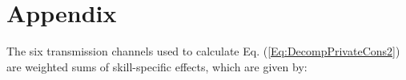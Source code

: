 \documentclass[a4paper,12pt]{article}
\begin{document}

\section{Appendix}
\label{Appendix B}

The six transmission channels used to calculate Eq. (\ref{Eq:DecompPrivateCons2}) are weighted sums of skill-specific effects, which are given by:
\end{document}
